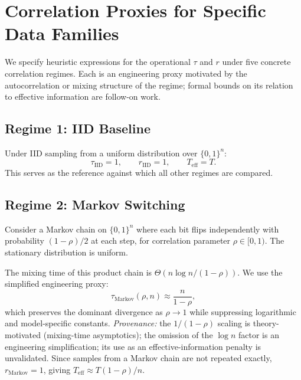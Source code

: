 \documentclass[sensors,article,submit,pdftex,moreauthors]{Definitions/mdpi}
\newcommand{\Teff}{T_{\mathrm{eff}}}
\begin{document}
\section{Correlation Proxies for Specific Data Families}
\label{sec:theory}

We specify heuristic expressions for the operational $\tau$ and $r$ under five concrete correlation regimes. Each is an engineering proxy motivated by the autocorrelation or mixing structure of the regime; formal bounds on its relation to effective information are follow-on work.

\subsection{Regime 1: IID Baseline}

Under IID sampling from a uniform distribution over $\{0,1\}^n$:
\begin{equation}
    \tau_{\text{IID}} = 1, \qquad r_{\text{IID}} = 1, \qquad \Teff = T.
\end{equation}
This serves as the reference against which all other regimes are compared.

\subsection{Regime 2: Markov Switching}

Consider a Markov chain on $\{0,1\}^n$ where each bit flips independently with probability $(1 - \rho)/2$ at each step, for correlation parameter $\rho \in [0, 1)$. The stationary distribution is uniform.

The mixing time of this product chain is $\Theta(n \log n / (1 - \rho))$. We use the simplified engineering proxy:
\begin{equation}
    \tau_{\text{Markov}}(\rho, n) \approx \frac{n}{1 - \rho},
    \label{eq:tau_markov}
\end{equation}
which preserves the dominant divergence as $\rho \to 1$ while suppressing logarithmic and model-specific constants. \emph{Provenance:} the $1/(1{-}\rho)$ scaling is theory-motivated (mixing-time asymptotics); the omission of the $\log n$ factor is an engineering simplification; its use as an effective-information penalty is unvalidated. Since samples from a Markov chain are not repeated exactly, $r_{\text{Markov}} = 1$, giving $\Teff \approx T(1{-}\rho)/n$.
\end{document}
